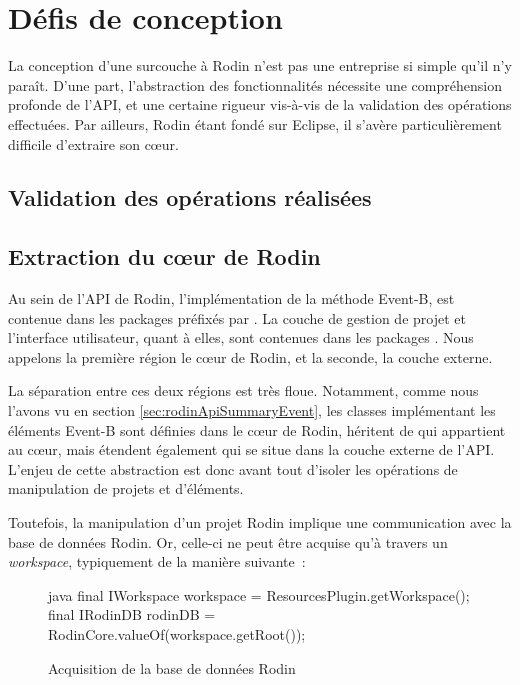 \section{Défis de conception}

La conception d'une surcouche à Rodin n'est pas une entreprise si simple qu'il n'y paraît.
D'une part, l'abstraction des fonctionnalités nécessite une compréhension profonde de l'API, et une certaine rigueur vis-à-vis de la validation %
des opérations effectuées.
Par ailleurs, Rodin étant fondé sur Eclipse, il s'avère particulièrement difficile d'extraire son cœur.


\subsection{Validation des opérations réalisées}


\subsection{Extraction du cœur de Rodin}

Au sein de l'API de Rodin, l'implémentation de la méthode Event-B, est contenue dans les packages préfixés par .
La couche de gestion de projet et l'interface utilisateur, quant à elles, sont contenues dans les packages .
Nous appelons la première région le cœur de Rodin, et la seconde, la couche externe.

La séparation entre ces deux régions est très floue.
Notamment, comme nous l'avons vu en section \ref{sec:rodinApiSummaryEvent}, les classes implémentant les éléments Event-B sont définies dans le cœur de Rodin, %
héritent de  qui appartient au cœur, mais étendent également  qui se situe dans la couche externe de l'API.
L'enjeu de cette abstraction est donc avant tout d'isoler les opérations de manipulation de projets et d'éléments.

Toutefois, la manipulation d'un projet Rodin implique une communication avec la base de données Rodin.
Or, celle-ci ne peut être acquise qu'à travers un \textit{workspace}, typiquement de la manière suivante~:

\begin{figure}[H]
\centering
\begin{imtaCode}{java}
final IWorkspace workspace = ResourcesPlugin.getWorkspace();
final IRodinDB rodinDB = RodinCore.valueOf(workspace.getRoot());
\end{imtaCode}
\caption{Acquisition de la base de données Rodin}
\label{fig:rodinDbAccess}
\end{figure}

